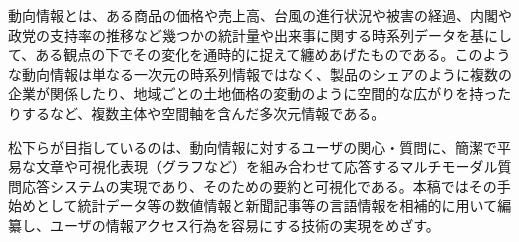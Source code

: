 \documentclass{matsushita-zemi}
\begin{document}
動向情報とは、ある商品の価格や売上高、台風の進行状況や被害の経過、内閣や政党の支持率の推移など幾つかの統計量や出来事に関する時系列データを基にして、ある観点の下でその変化を通時的に捉えて纏めあげたものである。このような動向情報は単なる一次元の時系列情報ではなく、製品のシェアのように複数の企業が関係したり、地域ごとの土地価格の変動のように空間的な広がりを持ったりするなど、複数主体や空間軸を含んだ多次元情報である。

松下らが目指しているのは、動向情報に対するユーザの関心・質問に、簡潔で平易な文章や可視化表現（グラフなど）を組み合わせて応答するマルチモーダル質問応答システムの実現であり、そのための要約と可視化である。本稿ではその手始めとして統計データ等の数値情報と新聞記事等の言語情報を相補的に用いて編纂し、ユーザの情報アクセス行為を容易にする技術の実現をめざす。



\end{document}

